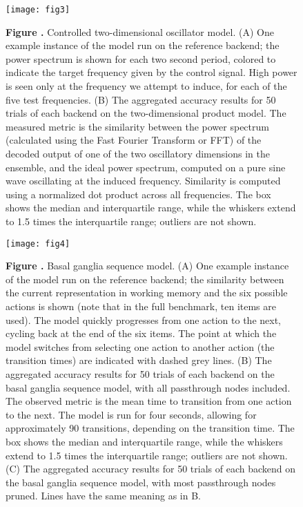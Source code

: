 \documentclass{frontiersSCNS}
\begin{document}
\begin{figure}[!ht]
\begin{center}
  \texttt{[image: fig3]}
\end{center}
\textbf{\label{fig:03} Figure .}
       {Controlled two-dimensional oscillator model. (A) One example
         instance of the model run on the reference backend;
         the power spectrum is shown for each two second period,
         colored to indicate the target frequency given by the control signal.
         High power is seen only at the frequency we attempt to induce,
         for each of the five test frequencies.
         (B) The aggregated accuracy results for 50 trials of
         each backend on the
         two-dimensional product model. The measured metric is the similarity
         between the power spectrum (calculated using the Fast Fourier
         Transform or FFT) of the decoded output of one of the two oscillatory
         dimensions in the ensemble, and the ideal power spectrum,
         computed on a pure sine wave oscillating at the induced frequency.
         Similarity is computed using a normalized dot product across
         all frequencies. The box shows the median and
         interquartile range, while the whiskers extend to 1.5 times the
         interquartile range; outliers are not shown.}
\end{figure}

\begin{figure}[!ht]
\begin{center}
  \texttt{[image: fig4]}
\end{center}
\textbf{\label{fig:04} Figure .}
       {Basal ganglia sequence model. (A) One example instance
         of the model run on the reference backend; the similarity between
         the current representation in working memory and the six possible
         actions is shown (note that in the full benchmark, ten items are
         used). The model quickly progresses from one action to the next,
         cycling back at the end of the six items. The point at which the
         model switches from selecting one action to another action
         (the transition times) are indicated with dashed grey lines.
         (B) The aggregated accuracy results for 50 trials of
         each backend on the
         basal ganglia sequence model, with all passthrough nodes included.
         The observed metric is the mean
         time to transition from one action to the next. The model is run
         for four seconds, allowing for approximately 90 transitions, depending
         on the transition time. The box shows the median and
         interquartile range, while the whiskers extend to 1.5 times the
         interquartile range; outliers are not shown.
         (C) The aggregated accuracy results for 50 trials of
         each backend on the
         basal ganglia sequence model, with most passthrough nodes pruned.
         Lines have the same meaning as in B.}
\end{figure}
\end{document}
